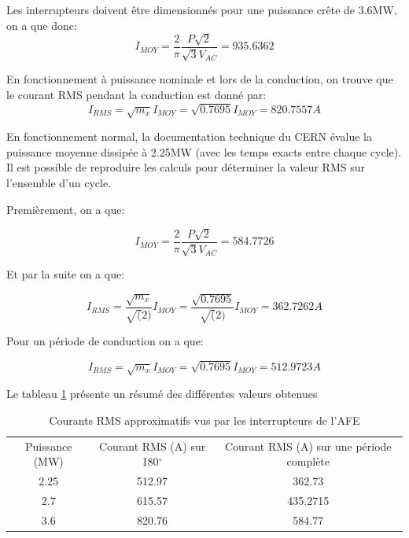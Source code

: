 Les interrupteurs doivent être dimensionnés pour une puissance crête de 3.6MW, on a que donc:
\begin{equation}
I_{MOY} = \frac{2}{\pi} \frac{P\sqrt{2}}{\sqrt{3}V_{AC}} = 935.6362
\end{equation}

En fonctionnement à puissance nominale et lors de la conduction, on trouve que le courant RMS pendant la conduction est donné par:
\begin{equation}
I_{RMS} =  \sqrt{m_x}I_{MOY} = \sqrt{0.7695}I_{MOY} = 820.7557A
\end{equation}

En fonctionnement normal, la documentation technique du CERN évalue la puissance moyenne dissipée à 2.25MW (avec les temps exacts entre chaque cycle). Il est possible de reproduire les calculs pour déterminer la valeur RMS sur l'ensemble d'un cycle.

Premièrement, on a que:

\begin{equation}
I_{MOY} = \frac{2}{\pi} \frac{P\sqrt{2}}{\sqrt{3}V_{AC}} = 584.7726
\end{equation}

Et par la suite on a que:

\begin{equation}
I_{RMS} =  \frac{\sqrt{m_x}}{\sqrt(2)}I_{MOY} = \frac{\sqrt{0.7695}}{\sqrt(2)}I_{MOY} = 362.7262A
\end{equation}

Pour un période de conduction on a que:

\begin{equation}
I_{RMS} =  \sqrt{m_x}I_{MOY} = \sqrt{0.7695}I_{MOY} = 512.9723A
\end{equation}

Le tableau \ref{tab_Courant_AFE} présente un résumé des différentes valeurs obtenues

\begin{table}[htb]
\begin{tabular}{|c|c|c|}
\hline
\multirow{2}{*}{Puissance (MW)} & \multirow{2}{*}{Courant RMS (A) sur 180$^\circ$} & \multirow{2}{*}{Courant RMS (A) sur une période complète} \\
                                &                                                 &                                                           \\ \hline
2.25                            & 512.97                                          & 362.73                                                    \\ \hline
2.7                             & 615.57                                          & 435.2715                                                    \\ \hline
3.6                             & 820.76                                          & 584.77                                                   \\ \hline
\end{tabular}
\caption{Courants RMS approximatifs vus par les interrupteurs de l'AFE}
\label{tab_Courant_AFE}
\end{table}

